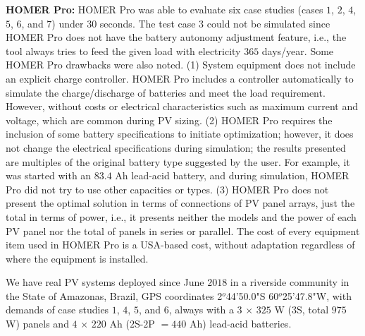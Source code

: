 \documentclass[journal]{IEEEtran}
\begin{document}
\textbf{HOMER Pro:} HOMER Pro was able to evaluate six case studies (cases $1$, $2$, $4$, $5$, $6$, and $7$) under $30$ seconds. The test case $3$ could not be simulated since HOMER Pro does not have the battery autonomy adjustment feature, i.e., the tool always tries to feed the given load with electricity $365$ days/year. Some HOMER Pro drawbacks were also noted. (1) System equipment does not include an explicit charge controller. HOMER Pro includes a controller automatically to simulate the charge/discharge of batteries and meet the load requirement. However, without costs or electrical characteristics such as maximum current and voltage, which are common during PV sizing. (2) HOMER Pro requires the inclusion of some battery specifications to initiate optimization; however, it does not change the electrical specifications during simulation; the results presented are multiples of the original battery type suggested by the user. For example, it was started with an $83.4$ Ah lead-acid battery, and during simulation, HOMER Pro did not try to use other capacities or types. (3) HOMER Pro does not present the optimal solution in terms of connections of PV panel arrays, just the total in terms of power, i.e., it presents neither the models and the power of each PV panel nor the total of panels in series or parallel. The cost of every equipment item used in HOMER Pro is a USA-based cost, without adaptation regardless of where the equipment is installed.

We have real PV systems deployed since June $2018$ in a riverside community in the State of Amazonas, Brazil, GPS coordinates 2$^{o}$44'50.0"S 60$^{o}$25'47.8"W, with demands of case studies $1$, $4$, $5$, and $6$, always with a $3$ $\times$ $325$ W ($3$S, total $975$ W) panels and $4$ $\times$ $220$ Ah ($2$S-$2$P $= 440$ Ah) lead-acid batteries.
\end{document}

